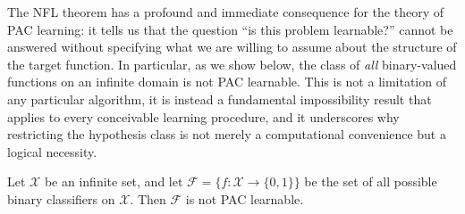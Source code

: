 %
The NFL theorem has a profound and immediate consequence for the theory of PAC learning: it tells us that the question ``is this problem learnable?'' cannot be answered without specifying what we are willing to assume about the structure of the target function. In particular, as we show below, the class of \emph{all} binary-valued functions on an infinite domain is not PAC learnable. This is not a limitation of any particular algorithm, it is instead a fundamental impossibility result that applies to every conceivable learning procedure, and it underscores why restricting the hypothesis class is not merely a computational convenience but a logical necessity.

\begin{theorem}
Let $\mathcal{X}$ be an infinite set, and let $\mathcal{F} = \{ f: \mathcal{X} \to \{0,1\} \}$ be the set of all possible binary classifiers on $\mathcal{X}$. Then $\mathcal{F}$ is not PAC learnable.
\end{theorem}

